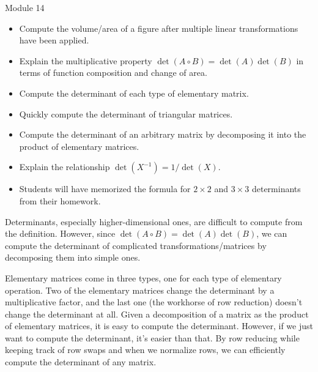 \documentclass{workbook}
\begin{document}
\begin{lesson}

	Module 14

	\begin{itemize}
		\item Compute the volume/area of a figure after multiple linear transformations
			have been applied.
		\item Explain the multiplicative property $\det(A\circ B)=\det(A)\det(B)$ in terms
			of function composition and change of area.
		\item Compute the determinant of each type of elementary matrix.
		\item Quickly compute the determinant of triangular matrices.
		\item Compute the determinant of an arbitrary matrix by decomposing it into the product of elementary matrices.
		\item Explain the relationship $\det(X^{-1})=1/\det(X)$.
	\end{itemize}

	\begin{annotation}
		\begin{notes}
			\begin{itemize}
				\item Students will have memorized the formula for $2\times 2$ and $3\times 3$ determinants
					from their homework.
			\end{itemize}
		\end{notes}
	\end{annotation}
	Determinants, especially higher-dimensional ones, are difficult to compute from the definition. However,
	since $\det(A\circ B)=\det(A)\det(B)$, we can compute the determinant of complicated transformations/matrices
	by decomposing them into simple ones.

	Elementary matrices come in three types, one for each type of elementary operation. Two of the elementary
	matrices change the determinant by a multiplicative factor, and the last one (the workhorse of row reduction) doesn't
	change the determinant at all. Given a decomposition of a matrix as the product of elementary matrices,
	it is easy to compute the determinant. However, if we just want to compute the determinant, it's easier than that.
	By row reducing while keeping track of row swaps and when
	we normalize rows, we can efficiently compute the determinant of any matrix.


\end{lesson}
\end{document}
